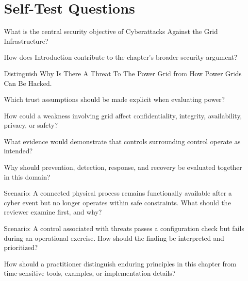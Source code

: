 \documentclass[11pt,letterpaper]{article}
\begin{document}
\section*{Self-Test Questions}
\begin{CornellRecallList}
\item What is the central security objective of Cyberattacks Against the Grid Infrastructure?
\item How does Introduction contribute to the chapter's broader security argument?
\item Distinguish Why Is There A Threat To The Power Grid from How Power Grids Can Be Hacked.
\item Which trust assumptions should be made explicit when evaluating power?
\item How could a weakness involving grid affect confidentiality, integrity, availability, privacy, or safety?
\item What evidence would demonstrate that controls surrounding control operate as intended?
\item Why should prevention, detection, response, and recovery be evaluated together in this domain?
\item Scenario: A connected physical process remains functionally available after a cyber event but no longer operates within safe constraints. What should the reviewer examine first, and why?
\item Scenario: A control associated with threats passes a configuration check but fails during an operational exercise. How should the finding be interpreted and prioritized?
\item How should a practitioner distinguish enduring principles in this chapter from time-sensitive tools, examples, or implementation details?
\end{CornellRecallList}
\end{document}
